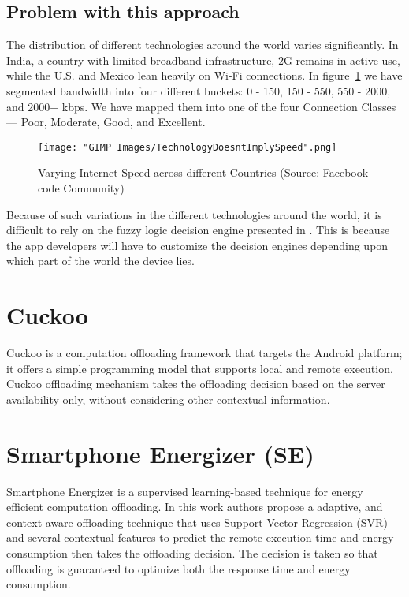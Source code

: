 \documentclass[12pt]{report}
\begin{document}
\subsection{Problem with this approach}
The distribution of different technologies around the world varies significantly. In India, a country with limited broadband infrastructure, 2G remains in active use, while the U.S. and Mexico lean heavily on Wi-Fi connections.
In figure~\ref{fig:TechnologyDoesntImplySpeed} we have segmented bandwidth into four different buckets: 0 - 150, 150 - 550, 550 - 2000, and 2000+ kbps. We have mapped them into one of the four Connection Classes — Poor, Moderate, Good, and Excellent.
\begin{figure}[h]
  \centering
  \texttt{[image: "GIMP Images/TechnologyDoesntImplySpeed".png]}
  \caption{Varying Internet Speed across different Countries (Source: Facebook code Community)}
  \label{fig:TechnologyDoesntImplySpeed}
\end{figure}

Because of such variations in the different technologies around the world, it is difficult to rely on the fuzzy logic decision engine presented in \cite{flores2013adaptive}. This is because the app developers will have to customize the decision engines depending upon which part of the world the device lies. 
\section{Cuckoo}
Cuckoo \cite{kemp2012cuckoo} is a computation offloading framework that targets the Android platform; it offers a simple
programming model that supports local and remote execution. Cuckoo offloading mechanism takes the offloading decision based on the server availability only, without considering other contextual information.
\section{Smartphone Energizer (SE) }
Smartphone Energizer \cite{khairy2013smartphone} is a supervised learning-based technique for energy efficient computation offloading. In this work authors propose a adaptive, and context-aware offloading technique that uses Support Vector
Regression (SVR) and several contextual features to predict the remote execution time and energy consumption then takes the offloading decision. The decision is taken so that offloading is guaranteed to optimize both the response time and energy
consumption.
\end{document}
